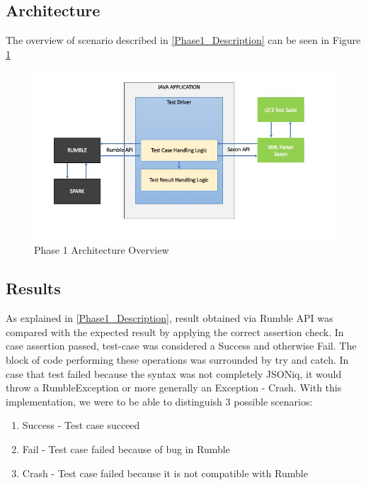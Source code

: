 \subsection{Architecture}
The overview of scenario described in \ref{Phase1_Description} can be seen in Figure \ref{fig:Phase1_Architecture}
 \begin{figure}[h!]
 	\vspace*{-5mm}
 	\includegraphics[width=\linewidth]{architecture_diagram_phase_1.jpeg}
 	\vspace*{-15mm}
 	\caption{Phase 1 Architecture Overview}
 	\label{fig:Phase1_Architecture}
 \end{figure}
 
\subsection{Results}

\label{Phase1_Results}
As explained in \ref{Phase1_Description}, result obtained via Rumble API was compared with the expected result by applying the correct assertion check. In case assertion passed, test-case was considered a Success and otherwise Fail. The block of code performing these operations was surrounded by try and catch. In case that test failed because the syntax was not completely JSONiq, it would throw a RumbleException or more generally an Exception - Crash. With this implementation, we were to be able to distinguish 3 possible scenarios:

\begin{enumerate}
	\item Success - Test case succeed
	\item Fail - Test case failed because of bug in Rumble
	\item Crash - Test case failed because it is not compatible with Rumble
\end{enumerate}

